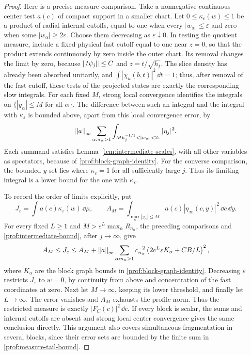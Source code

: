 \begin{proof}
Here is a precise measure comparison. Take a nonnegative continuous center
test \(a(c)\) of compact support in a smaller chart. Let
\(0\le\kappa_\varepsilon(w)\le1\) be a product of radial internal cutoffs,
equal to one when every \(|w_\alpha|\le\varepsilon\) and zero when some
\(|w_\alpha|\ge2\varepsilon\). Choose them decreasing as
\(\varepsilon\downarrow0\). In testing the quotient measure, include a fixed
physical fast cutoff equal to one near \(z=0\), so that the product extends
continuously by zero inside the outer chart. Its removal changes the limit
by zero, because \(\left\lVert t\psi_j\right\rVert\le C\) and \(z=t/\sqrt{h_j}\).
The slice density has already been absorbed unitarily, and
\(\int|\chi_u(b,t)|^2\,\dd t=1\); thus, after removal of the fast cutoff,
these tests of the projected states are exactly the corresponding slow
integrals. For each fixed \(M\), strong local convergence
identifies the integrals on \(\{|y_\alpha|\le M\text{ for all }\alpha\}\).
The difference between such an integral and the integral with
\(\kappa_\varepsilon\) is bounded above, apart from this local convergence
error, by
\begin{equation}\label{prof:measure-tail-bound}
 \norm{a}_\infty\sum_{\alpha:n_\alpha>1}
 \int_{Mh_j^{-1/3}<|w_\alpha|<2\varepsilon}|\eta_j|^2.
\end{equation}
Each summand satisfies Lemma~\ref{lem:intermediate-scales}, with all other
variables as spectators, because of \eqref{prof:block-graph-identity}.
For the converse comparison, the bounded \(y\) set lies where
\(\kappa_\varepsilon=1\) for all sufficiently large \(j\). Thus its limiting
integral is a lower bound for the one with \(\kappa_\varepsilon\).

To record the order of limits explicitly, put
\[
 J_\varepsilon=\int a(c)\kappa_\varepsilon(w)\,\dd\mu,
 \qquad
 A_M=\int_{\max_\alpha|y_\alpha|\le M}
                         a(c)|\eta_\infty(c,y)|^2\,\dd c\,\dd y.
\]
For every fixed \(L\ge1\) and
\(M>e^L\max_\alpha R_{n_\alpha}\), the preceding comparisons and
\eqref{prof:intermediate-bound}, after \(j\to\infty\), give
\[
 A_M\le J_\varepsilon\le A_M+
 \left\lVert a\right\rVert_\infty\sum_{\alpha:n_\alpha>1}
 c_{n_\alpha}^{-2}\left(2e^L\varepsilon K_\alpha+CB/L\right)^2,
\]
where \(K_\alpha\) are the block graph bounds in
\eqref{prof:block-graph-identity}. Decreasing \(\varepsilon\) restricts
\(J_\varepsilon\) to \(w=0\), by continuity from above and concentration
of the fast coordinates at zero. Next let \(M\to\infty\), keeping its
lower threshold, and finally let \(L\to\infty\). The error vanishes and
\(A_M\) exhausts the profile norm. Thus the restricted measure is exactly
\(|F_C(c)|^2\,\dd c\). If every block is scalar, the sums and internal
cutoffs are absent and strong local center convergence gives the same
conclusion directly.
This argument also covers simultaneous fragmentation in several blocks,
since their error sets are bounded by the finite sum in
\eqref{prof:measure-tail-bound}.


\end{proof}
